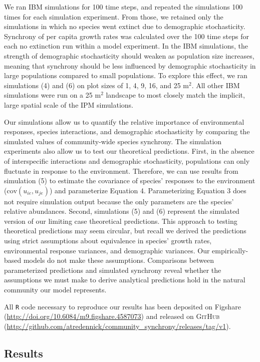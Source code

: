 \documentclass[12pt,]{article}
\begin{document}
We ran IBM simulations for 100 time steps, and repeated the simulations
100 times for each simulation experiment. From those, we retained only
the simulations in which no species went extinct due to demographic
stochasticity. Synchrony of per capita growth rates was calculated over
the 100 time steps for each no extinction run within a model experiment.
In the IBM simulations, the strength of demographic stochasticity should weaken as population size increases, meaning that synchrony should be less influenced by demographic stochasticity in large populations compared to small populations.
To explore this effect, we ran simulations (4) and
(6) on plot sizes of 1, 4, 9, 16, and 25 \(\text{m}^2\). All other IBM
simulations were run on a 25 \(\text{m}^2\) landscape
to most closely match the implicit, large spatial scale of the IPM simulations.

Our simulations allow us to quantify the relative importance of environmental responses, species interactions, and demographic stochasticity by comparing the simulated values of community-wide species synchrony.
The simulation experiments also allow us to test our theoretical
predictions. First, in the absence of interspecific interactions and
demographic stochasticity, populations can only fluctuate in response to
the environment. Therefore, we can use results from simulation (5) to
estimate the covariance of species' responses to the environment
(\(\text{cov}(u_{ie}, u_{je})\)) and parameterize Equation 4.
Parameterizing Equation 3 does not require simulation output because the
only parameters are the species' relative abundances. Second,
simulations (5) and (6) represent the simulated version of our limiting
case theoretical predictions.
This approach to testing theoretical predictions may seem circular, but recall we derived the predictions using strict assumptions about equivalence in species' growth rates, environmental response variances, and demographic variances.
Our empirically-based models do not make these assumptions.
Comparisons between parameterized predictions and simulated synchrony reveal whether the assumptions we must make to derive analytical predictions hold in the natural community our model represents.

All \texttt{R} code necessary to reproduce our results has been deposited on Figshare (\url{http://doi.org/10.6084/m9.figshare.4587073}) and released on \textsc{GitHub} (\url{http://github.com/atredennick/community_synchrony/releases/tag/v1}).

\subsection{Results}
\end{document}
